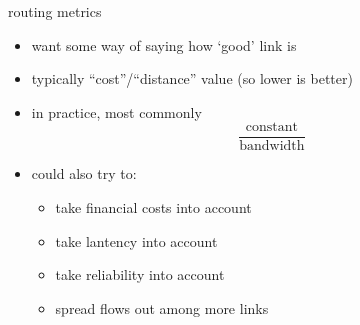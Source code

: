 \begin{frame}{routing metrics}
    \begin{itemize}
    \item want some way of saying how `good' link is
    \item typically ``cost''/``distance'' value (so lower is better)
    \item in practice, most commonly \[\frac{\text{constant}}{\text{bandwidth}}\]
    \vspace{.5cm}
    \item could also try to:
        \begin{itemize}
        \item take financial costs into account
        \item take lantency into account
        \item take reliability into account
        \item spread flows out among more links
        \end{itemize}
    \end{itemize}
\end{frame}
